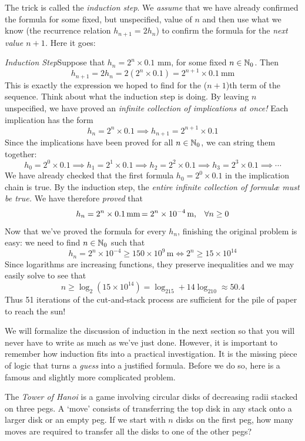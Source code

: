 The trick is called the \emph{induction step}. We \emph{assume} that we have already confirmed the formula for some fixed, but unspecified, value of $n$ and then use what we know (the recurrence relation $h_{n+1}=2h_n$) to confirm the formula for the \emph{next value $n+1$.} Here it goes:\par


\emph{Induction Step}\quad Suppose that $h_n=2^n\times 0.1$ mm, for some fixed $n\in\mathbb{N}_0$. Then
\[
	h_{n+1}=2h_n=2(2^n\times 0.1)=2^{n+1}\times 0.1\ \text{mm}
\]
This is exactly the expression we hoped to find for the ($n+1$)th term of the sequence. Think about what the induction step is doing. By leaving $n$ unspecified, we have proved an \emph{infinite collection of implications at once!} Each implication has the form
\[
	h_n=2^n\times 0.1\implies h_{n+1}=2^{n+1}\times 0.1
\]
Since the implications have been proved for all $n\in\mathbb{N}_0$, we can string them together:
\[
	h_0=2^0\times 0.1\implies h_{1}=2^{1}\times 0.1\implies h_{2}=2^{2}\times 0.1\implies h_{3}=2^{3}\times 0.1\implies \cdots
\]
We have already checked that the first formula $h_0=2^0\times 0.1$ in the implication chain is true. By the induction step, the \emph{entire infinite collection of formulæ must be true.} We have therefore \emph{proved} that
\[
	h_n=2^n\times 0.1\text{\,mm\,$=2^n\times 10^{-4}$\,m,}\quad \forall n\ge 0
\]
Now that we've proved the formula for every $h_n$, finishing the original problem is easy: we need to find $n\in\mathbb{N}_0$ such that
\[
	h_n=2^n\times 10^{-4}\ge 150\times 10^9\,\mathrm{m}\iff 2^n\ge 15\times 10^{14}
\]
Since logarithms are increasing functions, they preserve inequalities and we may easily solve to see that
\[
	n\ge\log_2(15\times 10^{14})=\log_215+14\log_210\approx 50.4
\]
Thus 51 iterations of the cut-and-stack process are sufficient for the pile of paper to reach the sun!\par

We will formalize the discussion of induction in the next section so that you will never have to write as much as we've just done. However, it is important to remember how induction fits into a practical investigation. It is the missing piece of logic that turns a \emph{guess} into a justified formula. Before we do so, here is a famous and slightly more complicated problem.



The \emph{Tower of Hanoi} is a game involving circular disks of decreasing radii stacked on three pegs. A `move' consists of transferring the top disk in any stack onto a larger disk or an empty peg. If we start with $n$ disks on the first peg, how many moves are required to transfer all the disks to one of the other pegs?\par


